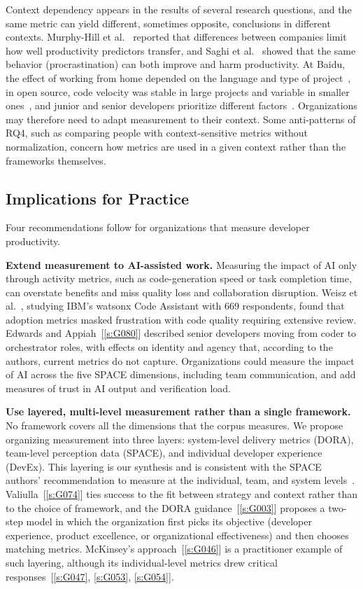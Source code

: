 \documentclass[preprint,number]{elsarticle}
\newcounter{study}
\newcommand{\refG}[1]{\ref{s:#1}}
\begin{document}
Context dependency appears in the results of several research questions, and the same metric can yield different, sometimes opposite, conclusions in different contexts. Murphy-Hill et al.~\cite{P0027} reported that differences between companies limit how well productivity predictors transfer, and Saghi et al.~\cite{P0181} showed that the same behavior (procrastination) can both improve and harm productivity. At Baidu, the effect of working from home depended on the language and type of project~\cite{P0611}, in open source, code velocity was stable in large projects and variable in smaller ones~\cite{P0162}, and junior and senior developers prioritize different factors~\cite{P0021}. Organizations may therefore need to adapt measurement to their context. Some anti-patterns of RQ4, such as comparing people with context-sensitive metrics without normalization, concern how metrics are used in a given context rather than the frameworks themselves.

\subsection{Implications for Practice}

Four recommendations follow for organizations that measure developer productivity.

\textbf{Extend measurement to AI-assisted work.} Measuring the impact of AI only through activity metrics, such as code-generation speed or task completion time, can overstate benefits and miss quality loss and collaboration disruption. Weisz et al.~\cite{P1299}, studying IBM's watsonx Code Assistant with 669 respondents, found that adoption metrics masked frustration with code quality requiring extensive review. Edwards and Appiah~[\refG{G080}] described senior developers moving from coder to orchestrator roles, with effects on identity and agency that, according to the authors, current metrics do not capture. Organizations could measure the impact of AI across the five SPACE dimensions, including team communication, and add measures of trust in AI output and verification load.

\textbf{Use layered, multi-level measurement rather than a single framework.} No framework covers all the dimensions that the corpus measures. We propose organizing measurement into three layers: system-level delivery metrics (DORA), team-level perception data (SPACE), and individual developer experience (DevEx). This layering is our synthesis and is consistent with the SPACE authors' recommendation to measure at the individual, team, and system levels~\cite{P1259}. Valiulla~[\refG{G074}] ties success to the fit between strategy and context rather than to the choice of framework, and the DORA guidance~[\refG{G003}] proposes a two-step model in which the organization first picks its objective (developer experience, product excellence, or organizational effectiveness) and then chooses matching metrics. McKinsey's approach~[\refG{G046}] is a practitioner example of such layering, although its individual-level metrics drew critical responses~[\refG{G047}, \refG{G053}, \refG{G054}].
\end{document}
